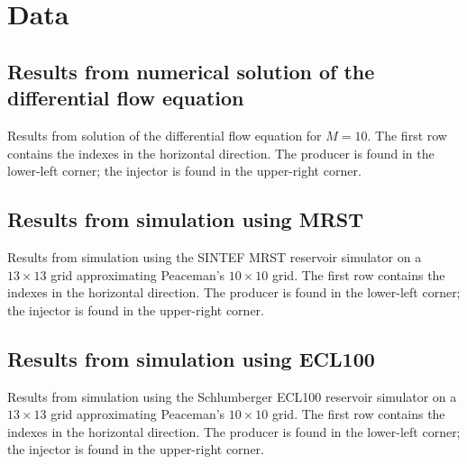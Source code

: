
\section{Data} %
\label{sec:data}
\subsection{Results from numerical solution of the differential flow equation} %
\label{sub:results_from_numerical_solution_of_the_differential_flow_equation}
Results from solution of the differential flow equation for $M=10$. The first row contains the indexes in the horizontal direction. The producer is found in the lower-left corner; the injector is found in the upper-right corner.

{\tiny
\vspace{.5cm}
\hspace{-1cm}
}

\subsection{Results from simulation using MRST} %
\label{sub:results_from_simulation_using_mrst}
Results from simulation using the SINTEF MRST reservoir simulator on a $13\times 13$ grid approximating Peaceman's $10\times 10$ grid. The first row contains the indexes in the horizontal direction. The producer is found in the lower-left corner; the injector is found in the upper-right corner.

{\tiny
\vspace{.5cm}
\hspace{-1cm}
}

\subsection{Results from simulation using ECL100} %
\label{sub:results_from_simulation_using_ecl100_metric}
Results from simulation using the Schlumberger ECL100 reservoir simulator on a $13\times 13$ grid approximating Peaceman's $10\times 10$ grid. The first row contains the indexes in the horizontal direction. The producer is found in the lower-left corner; the injector is found in the upper-right corner.

{\tiny
\vspace{.5cm}
\noindent
{}}

